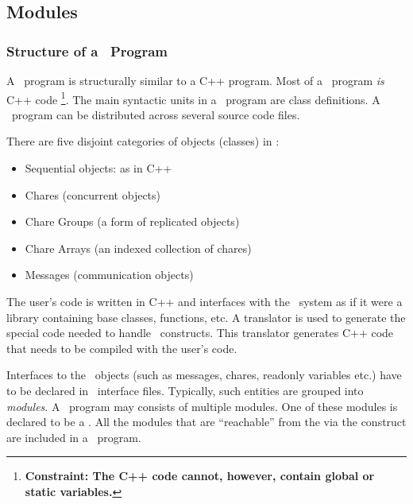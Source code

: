 \subsection{Modules}

\subsubsection{Structure of a \charmpp\ Program}

A \charmpp\ program is structurally similar to a C++ program.  Most of
a \charmpp\ program {\em is} C++ code
\footnote{\bf Constraint: The C++ code cannot, however,
contain global or static variables.}. The main syntactic units in a
\charmpp\ program are class definitions. A \charmpp\ program can
be distributed across several source code files.

There are five disjoint categories of objects (classes) in \charmpp:
\begin{itemize}
\item Sequential objects: as in C++
\item Chares (concurrent objects) 
\item Chare Groups  (a form of replicated objects)
\item Chare Arrays  (an indexed collection of chares)
\item Messages (communication objects)
\end{itemize}

The user's code is written in C++ and interfaces with the \charmpp\
system as if it were a library containing base classes, functions, etc.
A translator is used to generate the special code needed to handle
\charmpp\ constructs.  This translator generates C++ code that needs
to be compiled with the user's code.

Interfaces to the \charmpp\ objects (such as messages, chares, readonly 
variables etc.) \index{message}\index{chare}\index{readonly}
have to be declared in \charmpp\ interface files. Typically, such entities 
are grouped \index{module}
into {\em modules}. A \charmpp\ program may consists of multiple modules. 
One of these modules
is declared to be a . All the modules that are
``reachable'' from the \kw{mainmodule} via the  construct
are included in a \charmpp\ program.

